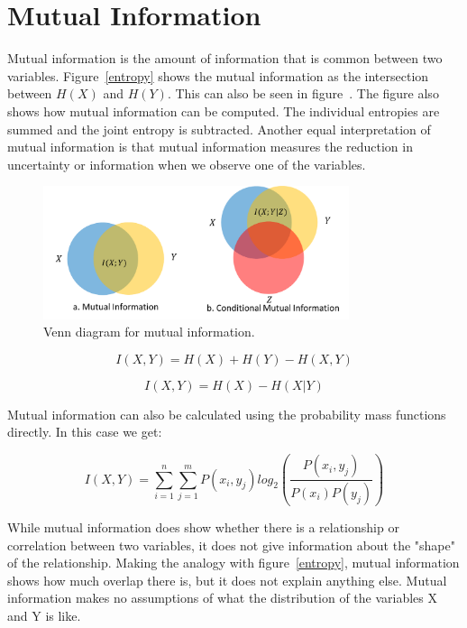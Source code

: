 \section{Mutual Information}
Mutual information is the amount of information that is common between two variables. Figure~\ref{entropy} shows the mutual information as the intersection between $H(X)$ and $H(Y)$. This can also be seen in figure~\label{mutual}. The figure also shows how mutual information can be computed. The individual entropies are summed and the joint entropy is subtracted. Another equal interpretation of mutual information is that mutual information measures the reduction in uncertainty or information when we observe one of the variables.

\begin{figure}[!htb]
\caption{Venn diagram for mutual information.}
\label{mutual}
    \centering
    \includegraphics[width=0.8\textwidth]{fig/mutual}
\end{figure}

\begin{equation}\label{info:mutual}
I(X,Y) = H(X) + H(Y) - H(X,Y)
\end{equation}

\begin{equation}
I(X,Y) = H(X) - H(X|Y)
\end{equation}

Mutual information can also be calculated using the probability mass functions directly. In this case we get:

\begin{equation}
I(X,Y) = \sum_{i=1}^{n}\sum_{j=1}^{m}P(x_i, y_j)log_2(\frac{P(x_i, y_j)}{P(x_i)P(y_j)})
\end{equation}
    
While mutual information does show whether there is a relationship or correlation between two variables, it does not give information about the "shape" of the relationship. Making the analogy with figure~\ref{entropy}, mutual information shows how much overlap there is, but it does not explain anything else. Mutual information makes no assumptions of what the distribution of the variables X and Y is like. 

